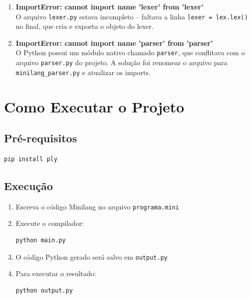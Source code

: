 \documentclass[12pt, a4paper]{article}
\begin{document}
\begin{enumerate}
    \item \textbf{ImportError: cannot import name 'lexer' from 'lexer'} \\
          O arquivo \texttt{lexer.py} estava incompleto -- faltava a linha \texttt{lexer = lex.lex()}
          no final, que cria e exporta o objeto do lexer.

    \item \textbf{ImportError: cannot import name 'parser' from 'parser'} \\
          O Python possui um módulo nativo chamado \texttt{parser}, que conflitava com o arquivo
          \texttt{parser.py} do projeto. A solução foi renomear o arquivo para
          \texttt{minilang\_parser.py} e atualizar os imports.

\end{enumerate}

\section{Como Executar o Projeto}

\subsection{Pré-requisitos}
\begin{lstlisting}[language=bash]
pip install ply
\end{lstlisting}

\subsection{Execução}
\begin{enumerate}
    \item Escreva o código Minilang no arquivo \texttt{programa.mini}
    \item Execute o compilador:
\begin{lstlisting}[language=bash]
python main.py
\end{lstlisting}
    \item O código Python gerado será salvo em \texttt{output.py}
    \item Para executar o resultado:
\begin{lstlisting}[language=bash]
python output.py
\end{lstlisting}
\end{enumerate}
\end{document}
